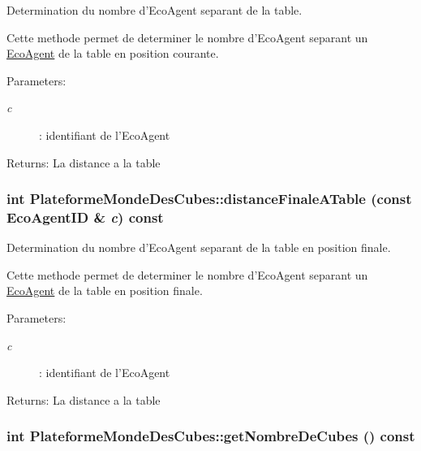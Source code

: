 Determination du nombre d'EcoAgent separant de la table. 

Cette methode permet de determiner le nombre d'EcoAgent separant un \hyperlink{classEcoAgent}{EcoAgent} de la table en position courante.

\begin{Desc}
\item[Parameters:]
\begin{description}
\item[{\em c}]: identifiant de l'EcoAgent \end{description}
\end{Desc}
\begin{Desc}
\item[Returns:]La distance a la table \end{Desc}
\hypertarget{classPlateformeMondeDesCubes_7f694f86cf4a9502cf6bba2d6eb5a371}{
\subsubsection[{distanceFinaleATable}]{\setlength{\rightskip}{0pt plus 5cm}int PlateformeMondeDesCubes::distanceFinaleATable (const {\bf EcoAgentID} \& {\em c}) const}}
\label{classPlateformeMondeDesCubes_7f694f86cf4a9502cf6bba2d6eb5a371}


Determination du nombre d'EcoAgent separant de la table en position finale. 

Cette methode permet de determiner le nombre d'EcoAgent separant un \hyperlink{classEcoAgent}{EcoAgent} de la table en position finale.

\begin{Desc}
\item[Parameters:]
\begin{description}
\item[{\em c}]: identifiant de l'EcoAgent \end{description}
\end{Desc}
\begin{Desc}
\item[Returns:]La distance a la table \end{Desc}
\hypertarget{classPlateformeMondeDesCubes_a341731830c30c695d5ef80c90377165}{
\subsubsection[{getNombreDeCubes}]{\setlength{\rightskip}{0pt plus 5cm}int PlateformeMondeDesCubes::getNombreDeCubes () const}}
\label{classPlateformeMondeDesCubes_a341731830c30c695d5ef80c90377165}


